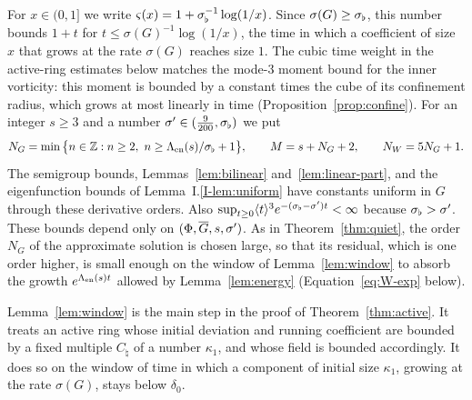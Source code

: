 For $x\in(0,1]$ we write $\varsigma(x)=1+\sigma_\flat^{-1}\log(1/x)$. Since
$\sigma(G)\ge\sigma_\flat$, this number bounds $1+t$ for $t\le\sigma(G)^{-1}\log(1/x)$,
the time in which a coefficient of size $x$ that grows at the rate $\sigma(G)$
reaches size $1$. The cubic time weight in the active-ring estimates below matches the
mode-$3$ moment bound for the inner vorticity: this moment is bounded by a
constant times the cube of its confinement radius, which grows at most linearly in time
(Proposition~\ref{prop:confine}). For an integer $s\ge3$ and a number
$\sigma'\in(\frac9{200},\sigma_\flat)$ we put
\begin{equation}
\label{eq:W-const}
N_G=\min\big\{n\in\mathbb{Z}:n\ge2,\ n\ge\Lambda_{\mathrm{en}}(s)/\sigma_\flat+1\big\},\qquad
M=s+N_G+2,\qquad N_W=5N_G+1.
\end{equation}
The semigroup bounds, Lemmas~\ref{lem:bilinear} and~\ref{lem:linear-part}, and
the eigenfunction bounds of Lemma~I.\ref{I-lem:uniform} have constants
uniform in $G$ through these derivative orders. Also
$\sup_{t\ge0}\langle t\rangle^3e^{-(\sigma_\flat-\sigma')t}<\infty$ because
$\sigma_\flat>\sigma'$. These bounds depend only on $(\Phi,\overline{G},s,\sigma')$. As in
Theorem~\ref{thm:quiet}, the order $N_G$ of the approximate solution is chosen
large, so that its residual, which is one order higher, is small enough on the
window of Lemma~\ref{lem:window} to absorb the growth $e^{\Lambda_{\mathrm{en}}(s)t}$ allowed by
Lemma~\ref{lem:energy} (Equation~\eqref{eq:W-exp} below).

Lemma~\ref{lem:window} is the main step in the proof of Theorem~\ref{thm:active}.
It treats an active ring whose initial deviation and running coefficient are
bounded by a fixed multiple $C_\natural$ of a number $\kappa_1$, and whose field is
bounded accordingly. It does so on the window of time in which a component of
initial size $\kappa_1$, growing at the rate $\sigma(G)$, stays below $\delta_0$.

